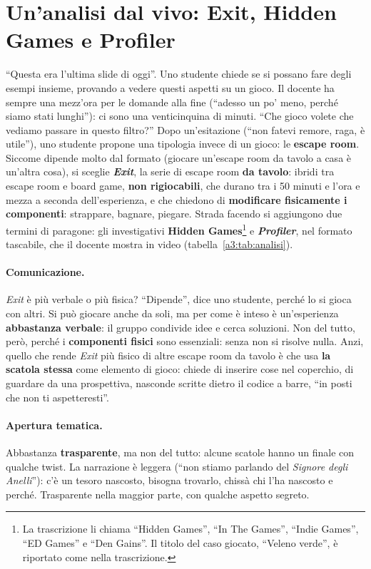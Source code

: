 \section{Un'analisi dal vivo: Exit, Hidden Games e Profiler}
\label{a3:sec:analisi}

``Questa era l'ultima slide di oggi''. Uno studente chiede se si possano fare
degli esempi insieme, provando a vedere questi aspetti su un gioco. Il docente
ha sempre una mezz'ora per le domande alla fine (``adesso un po' meno, perché
siamo stati lunghi''): ci sono una venticinquina di minuti. ``Che gioco volete
che vediamo passare in questo filtro?'' Dopo un'esitazione (``non fatevi remore,
raga, è utile''), uno studente propone una tipologia invece di un gioco: le
\textbf{escape room}. Siccome dipende molto dal formato (giocare un'escape room
da tavolo a casa è un'altra cosa), si sceglie \textbf{\emph{Exit}}, la serie di
escape room \textbf{da tavolo}: ibridi tra escape room e board game, \textbf{non
rigiocabili}, che durano tra i 50 minuti e l'ora e mezza a seconda
dell'esperienza, e che chiedono di \textbf{modificare fisicamente i componenti}:
strappare, bagnare, piegare. Strada facendo si aggiungono due termini di
paragone: gli investigativi \textbf{Hidden Games}\footnote{La trascrizione li
chiama ``Hidden Games'', ``In The Games'', ``Indie Games'', ``ED Games'' e ``Den
Gains''. Il titolo del caso giocato, ``Veleno verde'', è riportato come nella
trascrizione.} e \textbf{\emph{Profiler}}, nel formato tascabile, che il docente
mostra in video (tabella~\ref{a3:tab:analisi}).

\paragraph{Comunicazione.} \emph{Exit} è più verbale o più fisica? ``Dipende'',
dice uno studente, perché lo si gioca con altri. Si può giocare anche da soli,
ma per come è inteso è un'esperienza \textbf{abbastanza verbale}: il gruppo
condivide idee e cerca soluzioni. Non del tutto, però, perché i
\textbf{componenti fisici} sono essenziali: senza non si risolve nulla. Anzi,
quello che rende \emph{Exit} più fisico di altre escape room da tavolo è che usa
\textbf{la scatola stessa} come elemento di gioco: chiede di inserire cose nel
coperchio, di guardare da una prospettiva, nasconde scritte dietro il codice a
barre, ``in posti che non ti aspetteresti''.

\paragraph{Apertura tematica.} Abbastanza \textbf{trasparente}, ma non del tutto:
alcune scatole hanno un finale con qualche twist. La narrazione è leggera (``non
stiamo parlando del \emph{Signore degli Anelli}''): c'è un tesoro nascosto,
bisogna trovarlo, chissà chi l'ha nascosto e perché. Trasparente nella
maggior parte, con qualche aspetto segreto.

